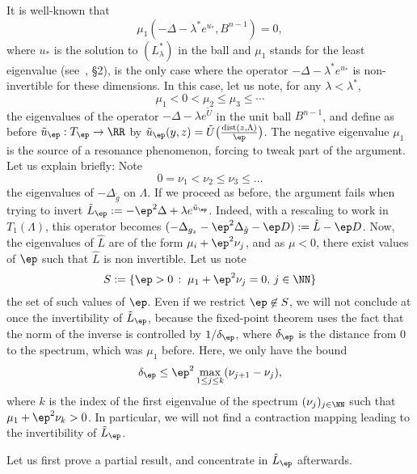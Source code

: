 It is well-known that
$$
\mu_1(-\Delta-\lambda^\ast e^{u_\ast},B^{n-1})=0,
$$
where $u_\ast$ is the solution to $(L_\lambda^\ast)$ in the ball and $\mu_1$
stands for the least eigenvalue (see~\cite{stable-solutions-elliptic}, \S 2),
is the only case where the operator $-\Delta-\lambda^\ast e^{u_\ast}$ is
non-invertible for these dimensions. In this case, let us note, for any
$\lambda < \lambda^\ast$,
$$\mu_1<0<\mu_2\leq \mu_3\leq \cdots$$
the eigenvalues of the operator $-\Delta-\lambda e^{\tilde U}$ in the unit ball
$B^{n-1}$, and define as before $\tilde u_\ep:T_\ep\to\RR$ by $\tilde
u_\ep(y,z)=\tilde U\big(\frac{\operatorname{dist}(z,\Lambda)}{\ep}\big)$. The
negative eigenvalue $\mu_1$ is the source of a resonance phenomenon, forcing
to tweak part of the argument. Let us explain briefly: Note
$$0=\nu_1<\nu_2\leq\nu_3\leq\dots $$
the eigenvalues of $-\Delta_{\mathring g}$ on $\Lambda$. If we proceed as
before, the argument fails when trying to invert $\tilde
L_\ep:=-\ep^2\Delta+\lambda e^{\tilde u_\ep}$. Indeed, with a rescaling to work
in $T_1( \Lambda )$, this operator becomes $(-\Delta_{g_z}-\ep^2
\Delta_{\mathring g}-\ep D):=\hat L - \ep D$. Now, the eigenvalues of $\hat L$
are of the form $\mu_i+\ep^2\nu_j$, and as $\mu<0$, there exist values of $\ep$
such that $\hat L$ is non invertible. Let us note
$$
S:=\{\ep>0\,:\; \mu_1+\ep^2\nu_j=0,\, j\in \NN\}
$$
the set of such values of $\ep$. Even if we restrict $\ep\not\in S$, we will not
conclude at once the invertibility of $\tilde L_\ep$, because the fixed-point
theorem uses the fact that the norm of the inverse is controlled by
$1/\delta_\ep$, where $\delta_\ep$ is the distance from $0$ to the spectrum,
which was $\mu_1$ before. Here, we only have the bound
$$
\delta_\ep\leq\ep^2 \max_{1\leq j \leq k}(\nu_{j+1}-\nu_j),
$$
where $k$ is the index of the first eigenvalue of the spectrum
$(\nu_j)_{j\in\NN}$ such that $\mu_1+\ep^2\nu_k>0$. In particular, we will not
find a contraction mapping leading to the invertibility of $\tilde L_\ep$.

Let us first prove a partial result, and concentrate in $\tilde L_\ep$ afterwards.

